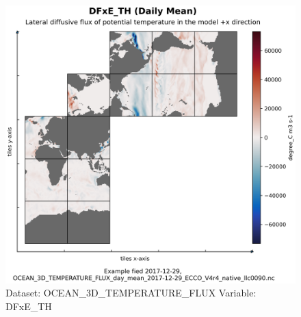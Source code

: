 \begin{figure}[H]
\centering
\includegraphics[scale=0.55]{../images/plots/native_plots/Ocean_Three-Dimensional_Potential_Temperature_Fluxes/DFxE_TH.png}
\caption{Dataset: OCEAN\_3D\_TEMPERATURE\_FLUX Variable: DFxE\_TH}
\label{tab:table-OCEAN_3D_TEMPERATURE_FLUX_DFxE_TH-Plot}
\end{figure}
\pagebreak
